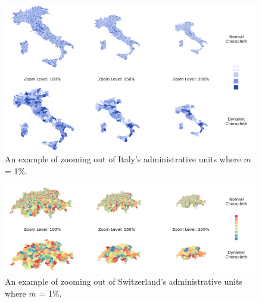 
\begin{figure}
\includegraphics[width=1\linewidth]{images/zoomOutExample}
\caption{An example of zooming out of Italy's administrative units where $m$ = 1\%.} \label{fig:zoomout}
\end{figure}
\begin{figure}
\includegraphics[width=1\linewidth]{images/zoomOutExample2}
\caption{ An example of zooming out of Switzerland's administrative units where $m$ = 1\%.}\label{fig:zoomout2}
\end{figure}

